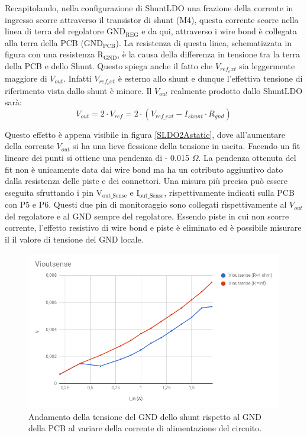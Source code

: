 Recapitolando, nella configurazione di ShuntLDO una frazione della corrente in ingresso scorre attraverso il transistor di shunt (M4), questa corrente scorre nella linea di terra del regolatore $\mathrm{GND_{REG}}$ e da qui, attraverso i wire bond è collegata alla terra della PCB ($\mathrm{GND_{PCB}}$). La resistenza di questa linea, schematizzata in figura con una resistenza $\mathrm{R_{GND}}$, è la causa della differenza in tensione tra la terra della PCB e dello Shunt. Questo spiega anche il fatto che $V_{ref_ext}$ sia leggermente maggiore di $V_{out}$. Infatti  $V_{ref_ext}$ è esterno allo shunt e dunque l'effettiva tensione di riferimento vista dallo shunt è minore. Il $V_{out}$ realmente prodotto dallo ShuntLDO sarà:
\begin{equation}
V_{out} = 2 \cdot V_{ref} = 2 \cdot ( V_{ref {\_} ext} - I_{shunt} \cdot R_{gnd} )
\end{equation}

Questo effetto è appena visibile in figura \ref{SLDO2Astatic}, dove all'aumentare della corrente $V_{out}$ si ha una lieve flessione della tensione in uscita. Facendo un fit lineare dei punti si ottiene una pendenza di - 0.015 $\Omega$. 
La pendenza ottenuta del fit non è unicamente data dai wire bond ma ha un cotributo aggiuntivo dato dalla resistenza delle piste e dei connettori. 
Una misura più precisa può essere eseguita sfruttando i pin $\mathrm{V_{out{\_}Sense}}$ e $\mathrm{I_{out {\_} Sense}}$, rispettivamente indicati sulla PCB con P5 e P6. 
Questi due pin di monitoraggio sono collegati rispettivamente al $V_{out}$ del regolatore e al GND sempre del regolatore. 
Essendo piste in cui non scorre corrente, l'effetto resistivo di wire bond e piste è eliminato ed è possibile misurare il il valore di tensione del GND locale.

\begin{figure}
\centering
\includegraphics[scale=.4]{Immagini/Viout}
\caption{Andamento della tensione del GND dello shunt rispetto al GND della PCB al variare della corrente di alimentazione del circuito.}
\label{VioutSense}
\end{figure}


